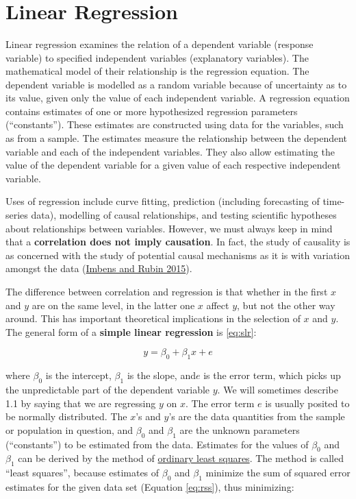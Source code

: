\documentclass[
]{svmono}
\begin{document}
~

~

~

\hypertarget{linear-regression}{%
\section{Linear Regression}\label{linear-regression}}

Linear regression examines the relation of a dependent variable
(response variable) to specified independent variables (explanatory
variables). The mathematical model of their relationship is the
regression equation. The dependent variable is modelled as a random
variable because of uncertainty as to its value, given only the value of
each independent variable. A regression equation contains estimates of
one or more hypothesized regression parameters (``constants''). These
estimates are constructed using data for the variables, such as from a
sample. The estimates measure the relationship between the dependent
variable and each of the independent variables. They also allow
estimating the value of the dependent variable for a given value of each
respective independent variable.

Uses of regression include curve fitting, prediction (including
forecasting of time-series data), modelling of causal relationships, and
testing scientific hypotheses about relationships between variables.
However, we must always keep in mind that a \textbf{correlation does not imply
causation}. In fact, the study of causality is as concerned with the
study of potential causal mechanisms as it is with variation amongst the
data (\protect\hyperlink{ref-Imbens2015}{Imbens and Rubin 2015}).

The difference between correlation and regression is that whether in the
first \(x\) and \(y\) are on the same level, in the latter one \(x\) affect
\(y\), but not the other way around. This has important theoretical
implications in the selection of \(x\) and \(y\). The general form of a
\textbf{simple linear regression} is \eqref{eq:slr}:

\begin{equation}
y=\beta_0+\beta_1x+e
\label{eq:slr}
\end{equation}

where \(\beta_0\) is the intercept, \(\beta_1\) is the slope, and\(e\) is the
error term, which picks up the unpredictable part of the dependent
variable \(y\). We will sometimes describe 1.1 by saying that we are
regressing \(y\) on \(x\). The error term \(e\) is usually posited to be
normally distributed. The \(x\)'s and \(y\)'s are the data quantities from
the sample or population in question, and \(\beta_0\) and \(\beta_1\) are
the unknown parameters (``constants'') to be estimated from the data.
Estimates for the values of \(\beta_0\) and \(\beta_1\) can be derived by
the method of \ul{ordinary least squares}. The method is called
``least squares'', because estimates of \(\beta_0\) and \(\beta_1\) minimize
the sum of squared error estimates for the given data set (Equation \eqref{eq:rss}), thus
minimizing:
\end{document}
